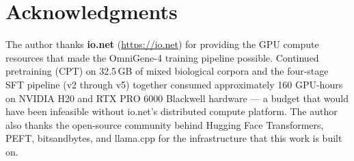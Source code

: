 \documentclass[11pt]{article}
\begin{document}
\section*{Acknowledgments}

The author thanks \textbf{io.net} (\url{https://io.net}) for providing the GPU compute resources that made the OmniGene-4 training pipeline possible. Continued pretraining (CPT) on 32.5\,GB of mixed biological corpora and the four-stage SFT pipeline (v2 through v5) together consumed approximately 160 GPU-hours on NVIDIA H20 and RTX PRO 6000 Blackwell hardware --- a budget that would have been infeasible without io.net's distributed compute platform. The author also thanks the open-source community behind Hugging Face Transformers, PEFT, bitsandbytes, and llama.cpp for the infrastructure that this work is built on.



\end{document}
